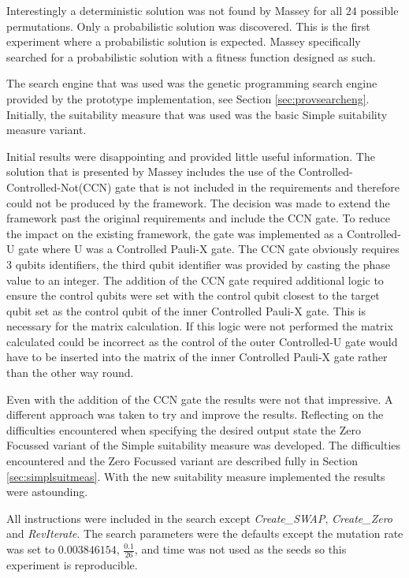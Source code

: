 Interestingly a deterministic solution was not found by Massey for all $24$ possible permutations.
Only a probabilistic solution was discovered.
This is the first experiment where a probabilistic solution is expected.
Massey specifically searched for a probabilistic solution with a fitness function designed as such.

The search engine that was used was the genetic programming search engine provided by the prototype implementation, see Section \ref{sec:provsearcheng}.
Initially, the suitability measure that was used was the basic Simple suitability measure variant.

Initial results were disappointing and provided little useful information.
The solution that is presented by Massey includes the use of the Controlled-Controlled-Not(CCN) gate that is not included in the requirements and therefore could not be produced by the framework.
The decision was made to extend the framework past the original requirements and include the CCN gate.
To reduce the impact on the existing framework, the gate was implemented as a Controlled-U gate where U was a Controlled Pauli-X gate.
The CCN gate obviously requires 3 qubits identifiers, the third qubit identifier was provided by casting the phase value to an integer.
The addition of the CCN gate required additional logic to ensure the control qubits were set with the control qubit closest to the target qubit set as the control qubit of the inner Controlled Pauli-X gate.
This is necessary for the matrix calculation.
If this logic were not performed the matrix calculated could be incorrect as the control of the outer Controlled-U gate would have to be inserted into the matrix of the inner Controlled Pauli-X gate rather than the other way round.

Even with the addition of the CCN gate the results were not that impressive.
A different approach was taken to try and improve the results.
Reflecting on the difficulties encountered when specifying the desired output state the Zero Focussed variant of the Simple suitability measure was developed.
The difficulties encountered and the Zero Focussed variant are described fully in Section \ref{sec:simplsuitmeas}.
With the new suitability measure implemented the results were astounding.

All instructions were included in the search except \emph{Create\_SWAP}, \emph{Create\_Zero} and \emph{RevIterate}.
The search parameters were the defaults except the mutation rate was set to $0.003846154$, $\frac{0.1}{26}$, and time was not used as the seeds so this experiment is reproducible.

